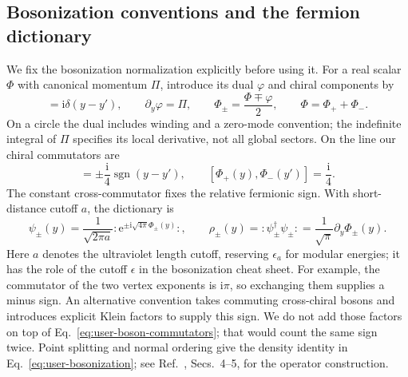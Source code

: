 \documentclass[aps,prb,onecolumn,nofootinbib,superscriptaddress]{revtex4-2}
\newcommand{\ii}{\mathrm{i}}
\newcommand{\e}{\mathrm{e}}
\begin{document}
\subsection{Bosonization conventions and the fermion dictionary}
We fix the bosonization normalization explicitly before using it.
For a real scalar $\Phi$ with canonical momentum $\Pi$, introduce its
dual $\varphi$ and chiral components by
\begin{equation}
 [\Phi(y),\Pi(y')]=\ii\delta(y-y'),\qquad
 \partial_y\varphi=\Pi,\qquad
 \Phi_\pm=\frac{\Phi\mp\varphi}{2},\qquad
 \Phi=\Phi_++\Phi_-.
 \label{eq:user-boson-fields}
\end{equation}
On a circle the dual includes winding and a zero-mode convention; the
indefinite integral of $\Pi$ specifies its local derivative, not all
global sectors. On the line our chiral commutators are
\begin{equation}
 [\Phi_\pm(y),\Phi_\pm(y')]
      =\pm\frac{\ii}{4}\operatorname{sgn}(y-y'),\qquad
 [\Phi_+(y),\Phi_-(y')]=\frac{\ii}{4}.
 \label{eq:user-boson-commutators}
\end{equation}
The constant cross-commutator fixes the relative fermionic sign. With
short-distance cutoff $a$, the dictionary is
\begin{equation}
 \psi_\pm(y)=\frac{1}{\sqrt{2\pi a}}
       :\!\e^{\pm\ii\sqrt{4\pi}\Phi_\pm(y)}\!:,
 \qquad
 \rho_\pm(y)=:\!\psi_\pm^\dagger\psi_\pm\!:
       =\frac{1}{\sqrt\pi}\partial_y\Phi_\pm(y).
\label{eq:user-bosonization}
\end{equation}
Here $a$ denotes the ultraviolet length cutoff, reserving $\epsilon_a$
for modular energies; it has the role of the cutoff $\epsilon$ in the
bosonization cheat sheet.
For example, the commutator of the two vertex exponents is $\ii\pi$,
so exchanging them supplies a minus sign. An alternative convention
takes commuting cross-chiral bosons and introduces explicit Klein
factors to supply this sign. We do not add those factors on top of
Eq.~\eqref{eq:user-boson-commutators}; that would count the same sign
twice. Point splitting and normal ordering give the density identity in
Eq.~\eqref{eq:user-bosonization}; see
Ref.~\cite{Senechal1999}, Secs.~4--5, for the operator construction.
\end{document}
